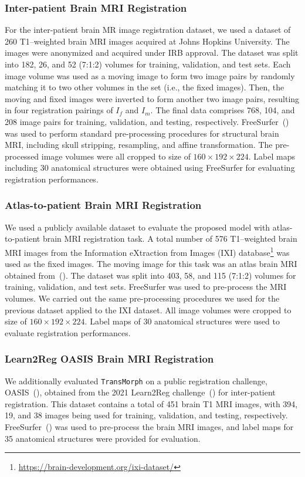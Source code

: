 \documentclass[times,twocolumn,final]{elsarticle}
\begin{document}
\subsubsection{Inter-patient Brain MRI Registration}
For the inter-patient brain MR image registration dataset, we used a dataset of 260 T1–weighted brain MRI images acquired at Johns Hopkins University. The images were anonymized and acquired under IRB approval. The dataset was split into 182, 26, and 52 (7:1:2) volumes for training, validation, and test sets. Each image volume was used as a moving image to form two image pairs by randomly matching it to two other volumes in the set (i.e., the fixed images). Then, the moving and fixed images were inverted to form another two image pairs, resulting in four registration pairings of $I_f$ and $I_m$. The final data comprises 768, 104, and 208 image pairs for training, validation, and testing, respectively. FreeSurfer~(\cite{fischl2012freesurfer}) was used to perform standard pre-processing procedures for structural brain MRI, including skull stripping, resampling, and affine transformation. The pre-processed image volumes were all cropped to size of $160\times192\times224$. Label maps including 30 anatomical structures were obtained using FreeSurfer for evaluating registration performances.

\subsubsection{Atlas-to-patient Brain MRI Registration}
We used a publicly available dataset to evaluate the proposed model with atlas-to-patient brain MRI registration task. A total number of 576 T1–weighted brain MRI images from the Information eXtraction from Images (IXI) database\footnote{\url{https://brain-development.org/ixi-dataset/}} was used as the fixed images. The moving image for this task was an atlas brain MRI obtained from~(\cite{kim2021cyclemorph}). The dataset was split into 403, 58, and 115 (7:1:2) volumes for training, validation, and test sets. FreeSurfer was used to pre-process the MRI volumes. We carried out the same pre-processing procedures we used for the previous dataset applied to the IXI dataset. All image volumes were cropped to size of $160\times192\times224$. Label maps of 30 anatomical structures were used to evaluate registration performances.

\subsubsection{Learn2Reg OASIS Brain MRI Registration}
We additionally evaluated \texttt{TransMorph} on a public registration challenge, OASIS~(\cite{marcus2007open, hoopes2021hypermorph}), obtained from the 2021 Learn2Reg challenge~(\cite{hering2021learn2reg}) for inter-patient registration. This dataset contains a total of 451 brain T1 MRI images, with 394, 19, and 38 images being used for training, validation, and testing, respectively. FreeSurfer~(\cite{fischl2012freesurfer}) was used to pre-process the brain MRI images, and label maps for 35 anatomical structures were provided for evaluation.
\end{document}
